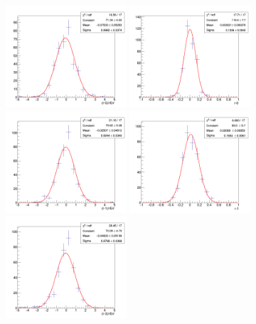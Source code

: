 \begin{figure}[!htb]
	\centering
	\includegraphics[width=0.4\textwidth]{Figures/signalInjection0_500_sigpull_1000.png}
	\includegraphics[width=0.4\textwidth]{Figures/signalInjection0_500_sigstrength_1000.png}
	\includegraphics[width=0.4\textwidth]{Figures/signalInjection1_500_sigpull_1000.png}
	\includegraphics[width=0.4\textwidth]{Figures/signalInjection1_500_sigstrength_1000.png}
	\includegraphics[width=0.4\textwidth]{Figures/signalInjection3_500_sigpull_1000.png}

\end{figure}
